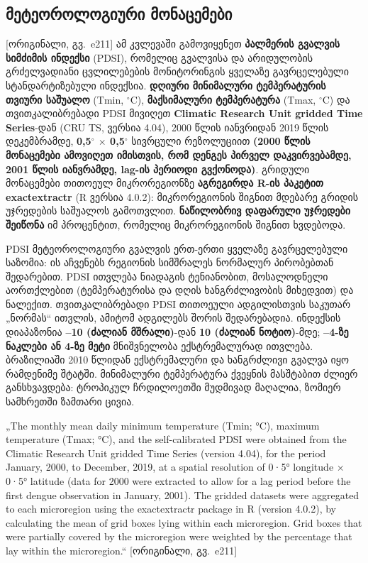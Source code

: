 \documentclass[11pt,a4paper]{article}
\newcommand{\imp}[1]{\textbf{\color{importred}#1}}
\newcommand{\pg}[1]{{\small\color{gray}[ორიგინალი, გვ.~#1]}}
\begin{document}
\subsection*{მეტეოროლოგიური მონაცემები} \pg{e211}
ამ კვლევაში გამოვიყენეთ \textbf{პალმერის გვალვის სიმძიმის ინდექსი} (PDSI), რომელიც გვალვისა და არიდულობის გრძელვადიანი
ცვლილებების მონიტორინგის ყველაზე გავრცელებული სტანდარტიზებული ინდექსია. \textbf{დღიური მინიმალური ტემპერატურის თვიური საშუალო}
(Tmin, $^\circ$C), \textbf{მაქსიმალური ტემპერატურა} (Tmax, $^\circ$C) და თვითკალიბრებადი PDSI მივიღეთ
\textbf{Climatic Research Unit gridded Time Series}-დან (CRU TS, ვერსია 4.04), 2000 წლის იანვრიდან 2019 წლის დეკემბრამდე,
\textbf{0,5$^\circ$ $\times$ 0,5$^\circ$} სივრცული რეზოლუციით \imp{(2000 წლის მონაცემები ამოვიღეთ იმისთვის, რომ დენგეს პირველ
დაკვირვებამდე, 2001 წლის იანვრამდე, lag-ის პერიოდი გვქონოდა)}. გრიდული მონაცემები თითოეულ მიკრორეგიონზე
\textbf{აგრეგირდა R-ის პაკეტით exactextractr} (R ვერსია 4.0.2): მიკრორეგიონის შიგნით მდებარე გრიდის უჯრედების საშუალოს
გამოთვლით. \textbf{ნაწილობრივ დაფარული უჯრედები შეიწონა} იმ პროცენტით, რომელიც მიკრორეგიონის შიგნით ხვდებოდა.

PDSI მეტეოროლოგიური გვალვის ერთ-ერთი ყველაზე გავრცელებული საზომია: ის აჩვენებს რეგიონის სიმშრალეს ნორმალურ პირობებთან
შედარებით. PDSI ითვლება ნიადაგის ტენიანობით, მოსალოდნელი აორთქლებით (ტემპერატურისა და დღის ხანგრძლივობის მიხედვით) და
ნალექით. თვითკალიბრებადი PDSI თითოეული ადგილისთვის საკუთარ „ნორმას“ ითვლის, ამიტომ ადგილებს შორის შედარებადია. ინდექსის
დიაპაზონია \textbf{--10 (ძალიან მშრალი)}-დან \textbf{10 (ძალიან ნოტიო)}-მდე; \textbf{--4-ზე ნაკლები ან 4-ზე მეტი} მნიშვნელობა
ექსტრემალურად ითვლება. ბრაზილიაში 2010 წლიდან ექსტრემალური და ხანგრძლივი გვალვა იყო რამდენიმე შტატში. მინიმალური ტემპერატურა
ქვეყნის მასშტაბით ძლიერ განსხვავდება: ტროპიკულ ჩრდილოეთში მუდმივად მაღალია, ზომიერ სამხრეთში ზამთარი ცივია.

\begin{citat}
„The monthly mean daily minimum temperature (Tmin; °C), maximum temperature (Tmax; °C), and the self-calibrated PDSI were obtained
from the Climatic Research Unit gridded Time Series (version 4.04), for the period January, 2000, to December, 2019, at a spatial
resolution of 0·5° longitude × 0·5° latitude (data for 2000 were extracted to allow for a lag period before the first dengue
observation in January, 2001). The gridded datasets were aggregated to each microregion using the exactextractr package in R
(version 4.0.2), by calculating the mean of grid boxes lying within each microregion. Grid boxes that were partially covered by
the microregion were weighted by the percentage that lay within the microregion.“ \pg{e211}
\end{citat}
\end{document}
